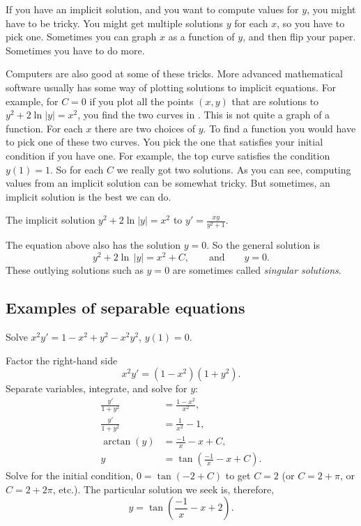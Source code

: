 If you have an implicit solution, and
you want to compute values
for $y$, you might have to be tricky.  You might get multiple solutions $y$
for each $x$, so you have to pick one.  Sometimes you can
graph $x$ as a function of $y$, and then flip your paper.
Sometimes you have to do more.

Computers are also good at some of these tricks.
More advanced mathematical software usually has some
way of plotting solutions to implicit equations.
For example, for $C=0$ if you plot all the points $(x,y)$ that
are solutions to $y^2+2\ln|y|=x^2$,
you find the two curves in .  This is not quite
a graph of a function. For each $x$ there are two choices of $y$.
To find a function you would have to pick one of these two curves.
You pick the one that satisfies your initial condition if you have one.
For example, the top curve satisfies the condition $y(1)=1$.
So for each $C$ we really got two solutions.
As you can see, computing values from an implicit solution can be somewhat
tricky.  But sometimes, an implicit solution is the best we can do.

\begin{myfig}
\capstart
{}
\caption{The implicit solution $y^2+2\ln|y|=x^2$ to $y'=\frac{xy}{y^2+1}$.\label{implicitsols:fig}}
\end{myfig}


The equation above also has the solution $y=0$.
So the general solution is 
\begin{equation*}
y^2 + 2 \ln \, \lvert y \rvert = x^2 + C, \qquad \text{and} \qquad y=0.
\end{equation*}
These outlying solutions
such as $y=0$
are sometimes called \emph{singular solutions}.

\subsection{Examples of separable equations}

\begin{example}
Solve $x^2y' = 1 - x^2+y^2 - x^2y^2$, $y(1) = 0$.

Factor the right-hand side
\begin{equation*}
x^2y' = (1 - x^2)(1+y^2) .
\end{equation*}
Separate variables, integrate, and solve for $y$:
\begin{align*}
\frac{y'}{1+y^2} & = \frac{1 - x^2}{x^2} , \\
\frac{y'}{1+y^2} & = \frac{1}{x^2} - 1 , \\
\operatorname{arctan} (y) & = \frac{-1}{x} - x + C , \\
y & = \tan \left(\frac{-1}{x} - x + C\right) .
\end{align*}
Solve for the initial condition, $0 = \tan(-2+C)$ to get $C=2$ (or $C = 2 +
\pi$, or $C = 2 + 2\pi$, etc.).  The particular solution we seek is, therefore,
\begin{equation*}
y = \tan \left(\frac{-1}{x} - x + 2 \right) .
\end{equation*}
\end{example}

